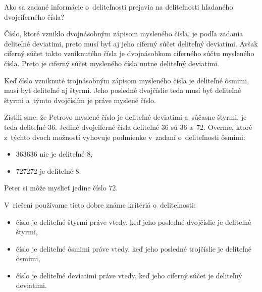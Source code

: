 {%
\napad
Ako sa zadané informácie o~deliteľnosti prejavia na deliteľnosti hľadaného dvojciferného čísla?

\riesenie
Číslo, ktoré vzniklo dvojnásobným zápisom mysleného čísla, je podľa zadania
deliteľné deviatimi, preto musí byť aj jeho ciferný súčet deliteľný deviatimi.
Avšak ciferný súčet takto vzniknutého čísla je dvojnásobkom ciferného súčtu
mysleného čísla.
Preto je ciferný súčet mysleného čísla nutne deliteľný deviatimi.

Keď číslo vzniknuté trojnásobným zápisom mysleného čísla je deliteľné ôsmimi,
musí byť deliteľné aj štyrmi.
Jeho posledné dvojčíslie teda musí byť deliteľné štyrmi a~týmto dvojčíslím je
práve myslené číslo.

Zistili sme, že Petrovo myslené číslo je deliteľné deviatimi a~súčasne
štyrmi, je teda deliteľné 36.
Jediné dvojciferné čísla deliteľné 36 sú 36 a~72.
Overme, ktoré z~týchto dvoch možností vyhovuje podmienke v~zadaní o~deliteľnosti ôsmimi:
\begin{itemize}
\item 363636 nie je deliteľné 8,
\item 727272 je deliteľné 8.
\end{itemize}
\noindent
Peter si môže myslieť jedine číslo 72.

\poznamka
V~riešení používame tieto dobre známe kritériá o~deliteľnosti:
\begin{itemize}
\item číslo je deliteľné štyrmi práve vtedy, keď jeho posledné dvojčíslie je
deliteľné štyrmi,
\item číslo je deliteľné ôsmimi práve vtedy, keď jeho posledné trojčíslie je
deliteľné ôsmimi,
\item číslo je deliteľné deviatimi práve vtedy, keď jeho ciferný súčet je
deliteľný deviatimi.
\end{itemize}
}

